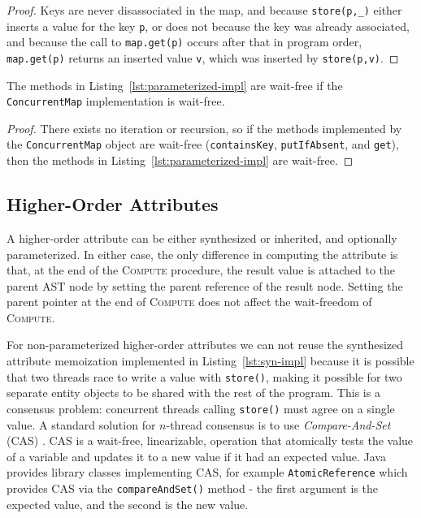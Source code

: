 {\begin{proof}
  Keys are never disassociated in the map, and because \verb'store(p,_)'
  either inserts a value for the key \verb'p', or does not because the
  key was already associated, and because the call to \verb'map.get(p)'
  occurs after that in program order, \verb'map.get(p)'
  returns an inserted value \verb'v', which was inserted by \verb'store(p,v)'.
\end{proof}

\begin{theorem}
  The methods in Listing~\ref{lst:parameterized-impl} are wait-free
  if the \verb'ConcurrentMap' implementation is wait-free.
\end{theorem}

\begin{proof}
  There exists no iteration or recursion, so if the methods implemented by the \verb'ConcurrentMap'
  object are wait-free (\verb'containsKey', \verb'putIfAbsent', and
  \verb'get'), then the methods in Listing~\ref{lst:parameterized-impl} are wait-free.
\end{proof}



\subsection{Higher-Order Attributes}
\label{nta-compute}

A higher-order attribute can be either synthesized or inherited, and optionally parameterized.
In either case, the only difference in computing the attribute is that, at the end of the
\textsc{Compute} procedure, the result value is attached to the parent AST node by
setting the parent reference of the result node.
Setting the parent pointer at the end of \textsc{Compute} does not affect the
wait-freedom of \textsc{Compute}.

For non-parameterized higher-order attributes we can not reuse the synthesized attribute memoization
implemented in Listing~\ref{lst:syn-impl}
because it is possible that two threads race to write a value with \verb'store()', making
it possible for two separate entity objects to be shared with the rest of the program. This is a
consensus problem: concurrent threads calling \verb'store()' must agree on a single
value.
A standard solution for $n$-thread consensus is to use \emph{Compare-And-Set} (CAS)
\cite{DBLP:conf/podc/Herlihy06}.  CAS is a wait-free, linearizable, operation that atomically tests
the value of a variable and updates it to a new value if it had an expected value.  Java provides
library classes implementing CAS, for example \verb'AtomicReference' which provides CAS via the
\verb'compareAndSet()' method - the first argument is the expected value, and the second is the new
value.

}
